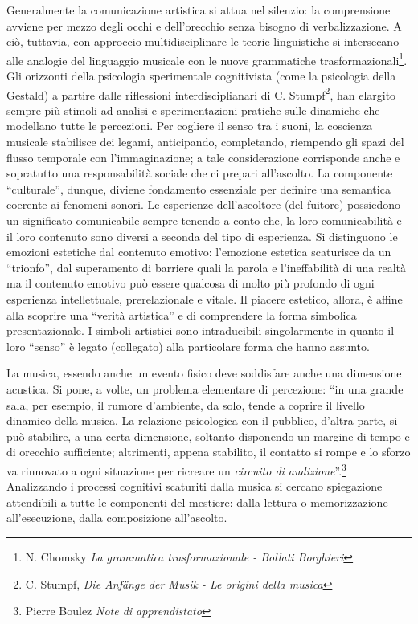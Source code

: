 \documentclass[a4paper,12pt]{article}
\newcommand{\virgo}[1]{``#1''}
\begin{document}
Generalmente la comunicazione artistica si attua nel silenzio: la comprensione avviene per mezzo degli occhi e dell'orecchio senza bisogno di verbalizzazione.
A ciò, tuttavia, con approccio multidisciplinare le teorie linguistiche si intersecano alle analogie del linguaggio musicale con le nuove grammatiche trasformazionali\footnote{N. Chomsky \emph{La grammatica trasformazionale - Bollati Borghieri}}. Gli orizzonti della psicologia sperimentale cognitivista (come la psicologia della Gestald) a partire dalle riflessioni interdisciplianari di C. Stumpf\footnote{C. Stumpf, \emph{Die Anfänge der Musik - Le origini della musica}}, han elargito sempre più stimoli ad analisi e sperimentazioni pratiche sulle dinamiche che modellano tutte le percezioni\cite{rif3}. Per cogliere il senso tra i suoni, la coscienza musicale stabilisce dei legami, anticipando, completando, riempendo gli spazi del flusso temporale con l'immaginazione; a tale considerazione corrisponde anche e sopratutto una responsabilità sociale che ci prepari all'ascolto. La componente \virgo{culturale}, dunque, diviene fondamento essenziale per definire una semantica coerente ai fenomeni sonori\cite{rif1, rif3, rif5, rif7}. Le esperienze dell'ascoltore (del fuitore) possiedono un significato comunicabile sempre tenendo a conto che, la loro comunicabilità e il loro contenuto sono diversi a seconda del tipo di esperienza\cite{rif9}.
Si distinguono le emozioni estetiche dal contenuto emotivo: l'emozione estetica scaturisce da un \virgo{trionfo}, dal superamento di barriere quali la parola e l'ineffabilità di una realtà ma il contenuto emotivo può essere qualcosa di molto più profondo di ogni esperienza intellettuale, prerelazionale e vitale. Il piacere estetico, allora, è affine alla scoprire una \virgo{verità artistica} e di comprendere la forma simbolica presentazionale. I simboli artistici sono intraducibili singolarmente in quanto il loro \virgo{senso} è legato (collegato) alla particolare forma che hanno assunto.\cite{rif9}

La musica, essendo anche un evento fisico deve soddisfare anche una dimensione acustica\cite{rif4}. Si pone, a volte, un problema elementare di percezione: \virgo{in una grande sala, per esempio, il rumore d'ambiente, da solo, tende a coprire il livello dinamico della musica. La relazione psicologica con il pubblico, d'altra parte, si può stabilire, a una certa dimensione, soltanto disponendo un margine di tempo e di orecchio sufficiente; altrimenti, appena stabilito, il contatto si rompe e lo sforzo va rinnovato a ogni situazione per ricreare un \textit{circuito di audizione}}.\footnote{Pierre Boulez \textit{Note di apprendistato}}\\
Analizzando i processi cognitivi scaturiti dalla musica si cercano spiegazione attendibili a tutte le componenti del mestiere: dalla lettura o memorizzazione all'esecuzione, dalla composizione  all'ascolto.\cite{rif7}  
\end{document}
